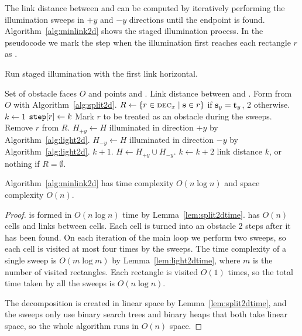 \documentclass[english,gradu]{tktltiki2018}
\begin{document}
The link distance between \spt and \ept can be computed by iteratively performing the illumination sweeps in $+y$ and $-y$ directions until the endpoint is found.
Algorithm~\ref{alg:minlink2d} shows the staged illumination process.
In the pseudocode we mark the step when the illumination first reaches each rectangle $r$ as .

\begin{algorithm}
\caption{Run staged illumination with the first link horizontal.}\label{alg:minlink2d}
\begin{algorithmic}
\Require Set of obstacle faces $O$ and points \spt and \ept.
\Output Link distance between \spt and \ept.
\State Form  from $O$ with Algorithm~\ref{alg:split2d}.
\State $R\gets\left\{r\in\textsc{dec}_{x} \mid \textbf{s}\in r\right\}$
	\State {} if $\textbf{s}_y=\textbf{t}_y$, 2 otherwise.
\EndIf
\State $k\gets 1$
			\State $\texttt{step}{[r]}\gets k$
			\State Mark $r$ to be treated as an obstacle during the sweeps.
			\State Remove $r$ from $R$.
		\EndIf
	\EndFor
	\State $H_{+y}\gets H$ illuminated in direction $+y$ by Algorithm~\ref{alg:light2d}.
	\State $H_{-y}\gets H$ illuminated in direction $-y$ by Algorithm~\ref{alg:light2d}.
		\State \Return $k+1$.
	\EndIf
	\State $H\gets H_{+y}\cup H_{-y}$.
	\State $k\gets k+2$
\EndWhile
\State \Return link distance $k$, or nothing if $R=\emptyset$.
\end{algorithmic}
\end{algorithm}

\begin{theo}\label{theo:minlink2d}Algorithm~\ref{alg:minlink2d} has time complexity $O(n\log n)$ and space complexity $O(n)$.\end{theo}
\begin{proof}
 is formed in $O(n\log n)$ time by Lemma~\ref{lem:split2dtime}.
 has $O(n)$ cells and links between cells.
Each cell is turned into an obstacle 2 steps after it has been found.
On each iteration of the main loop we perform two sweeps, so each cell is visited at most four times by the sweeps.
The time complexity of a single sweep is $O(m\log m)$ by Lemma~\ref{lem:light2dtime}, where $m$ is the number of visited rectangles.
Each rectangle is visited $O(1)$ times, so the total time taken by all the sweeps is $O(n\log n)$.

The decomposition is created in linear space by Lemma~\ref{lem:split2dtime}, and the sweeps only use binary search trees and binary heaps that both take linear space, so the whole algorithm runs in $O(n)$ space.
\end{proof}
\end{document}
